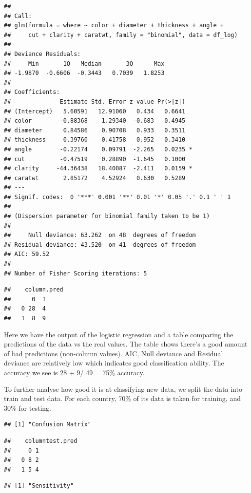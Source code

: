\documentclass[
  8pt,
]{article}
\begin{document}
\begin{verbatim}
## 
## Call:
## glm(formula = where ~ color + diameter + thickness + angle + 
##     cut + clarity + caratwt, family = "binomial", data = df_log)
## 
## Deviance Residuals: 
##     Min       1Q   Median       3Q      Max  
## -1.9870  -0.6606  -0.3443   0.7039   1.8253  
## 
## Coefficients:
##              Estimate Std. Error z value Pr(>|z|)  
## (Intercept)   5.60591   12.91060   0.434   0.6641  
## color        -0.88368    1.29340  -0.683   0.4945  
## diameter      0.84586    0.90708   0.933   0.3511  
## thickness     0.39760    0.41758   0.952   0.3410  
## angle        -0.22174    0.09791  -2.265   0.0235 *
## cut          -0.47519    0.28890  -1.645   0.1000  
## clarity     -44.36438   18.40087  -2.411   0.0159 *
## caratwt       2.85172    4.52924   0.630   0.5289  
## ---
## Signif. codes:  0 '***' 0.001 '**' 0.01 '*' 0.05 '.' 0.1 ' ' 1
## 
## (Dispersion parameter for binomial family taken to be 1)
## 
##     Null deviance: 63.262  on 48  degrees of freedom
## Residual deviance: 43.520  on 41  degrees of freedom
## AIC: 59.52
## 
## Number of Fisher Scoring iterations: 5
\end{verbatim}

\begin{verbatim}
##    column.pred
##      0  1
##   0 28  4
##   1  8  9
\end{verbatim}

Here we have the output of the logistic regression and a table comparing
the predictions of the data vs the real values. The table shows there's
a good amount of bad predictions (non-column values). AIC, Null deviance
and Residual deviance are relatively low which indicates good
classification ability. The accuracy we see is 28 + 9/ 49 = 75\%
accuracy.

To further analyse how good it is at classifying new data, we split the
data into train and test data. For each country, 70\% of its data is
taken for training, and 30\% for testing.

\begin{verbatim}
## [1] "Confusion Matrix"
\end{verbatim}

\begin{verbatim}
##    columntest.pred
##     0 1
##   0 8 2
##   1 5 4
\end{verbatim}

\begin{verbatim}
## [1] "Sensitivity"
\end{verbatim}
\end{document}
